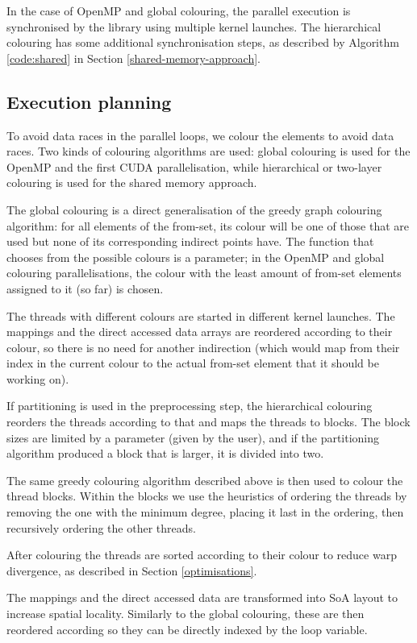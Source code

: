 In the case of OpenMP and global colouring, the parallel execution is
synchronised by the library using multiple kernel launches. The hierarchical
colouring has some additional synchronisation steps, as described by Algorithm
\ref{code:shared} in Section \ref{shared-memory-approach}.

\subsection{Execution planning}

To avoid data races in the parallel loops, we colour the elements to avoid data
races. Two kinds of colouring algorithms are used: global colouring is used for
the OpenMP and the first CUDA parallelisation, while hierarchical or two-layer
colouring is used for the shared memory approach.

The global colouring is a direct generalisation of the greedy graph colouring
algorithm: for all elements of the from-set, its colour will be one of those
that are used but none of its corresponding indirect points have. The function
that chooses from the possible colours is a parameter; in the OpenMP and global
colouring parallelisations, the colour with the least amount of from-set
elements assigned to it (so far) is chosen.

The threads with different colours are started in different kernel launches. The
mappings and the direct accessed data arrays are reordered according to their
colour, so there is no need for another indirection (which would map from their
index in the current colour to the actual from-set element that it should be
working on).

If partitioning is used in the preprocessing step, the hierarchical colouring
reorders the threads according to that and maps the threads to blocks. The block
sizes are limited by a parameter (given by the user), and if the partitioning
algorithm produced a block that is larger, it is divided into two.

The same greedy colouring algorithm described above is then used to colour the
thread blocks. Within the blocks we use the heuristics of ordering the threads
by removing the one with the minimum degree, placing it last in the ordering,
then recursively ordering the other threads.

After colouring the threads are sorted according to their colour to reduce warp
divergence, as described in Section \ref{optimisations}.

The mappings and the direct accessed data are transformed into SoA layout to
increase spatial locality. Similarly to the global colouring, these are then
reordered according so they can be directly indexed by the loop variable.

